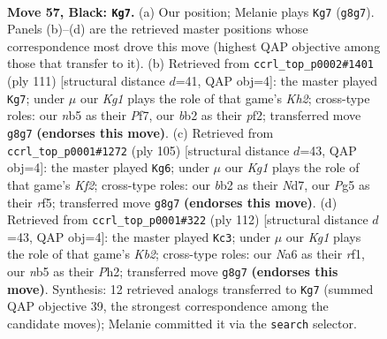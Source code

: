 \documentclass[11pt]{article}
\begin{document}
\clearpage

\begin{figure}[p]\centering
\begin{subfigure}{0.46\textwidth}\centering
\resizebox{\linewidth}{!}{%
\newchessgame
\chessboard[
  setfen={6k1/4p3/npr4p/pN4p1/P1p5/2P2PK1/1B1R4/8 b - - 3 57},
  showmover=false,
  pgfstyle=straightmove, color=movearrow, markmove={g8-g7}
]}
\caption{}
\end{subfigure}\hfill
\begin{subfigure}{0.46\textwidth}\centering
\resizebox{\linewidth}{!}{%
\newchessgame
\chessboard[
  setfen={8/5p1k/1p2r2p/6p1/P2Rp1P1/4P3/5PPK/8 b - - 16 56},
  showmover=false,
  pgfstyle=straightmove, color=movearrow, markmove={h7-g7}
]}
\caption{}
\end{subfigure}
\\[4pt]
\begin{subfigure}{0.46\textwidth}\centering
\resizebox{\linewidth}{!}{%
\newchessgame
\chessboard[
  setfen={8/1p1n1k2/p1pr3p/5R2/2P5/2B2P1P/1P3K2/8 b - - 6 53},
  showmover=false,
  pgfstyle=straightmove, color=movearrow, markmove={f7-g6}
]}
\caption{}
\end{subfigure}\hfill
\begin{subfigure}{0.46\textwidth}\centering
\resizebox{\linewidth}{!}{%
\newchessgame
\chessboard[
  setfen={8/p2k1p2/1p2p1p1/1P2P3/P3R2P/8/1KP4P/5r2 w - - 11 57},
  showmover=false,
  pgfstyle=straightmove, color=movearrow, markmove={b2-c3}
]}
\caption{}
\end{subfigure}
\caption{\textbf{Move 57, Black: \texttt{Kg7}.} (a) Our position; Melanie plays \texttt{Kg7} (\texttt{g8g7}). Panels (b)--(d) are the retrieved master positions whose correspondence most drove this move (highest QAP objective among those that transfer to it). (b) Retrieved from \texttt{ccrl\_top\_p0002\#1401} (ply 111) [structural distance $d$=41, QAP obj=4]: the master played \texttt{Kg7}; under $\mu$ our \emph{Kg1} plays the role of that game's \emph{Kh2}; cross-type roles: our \emph{n}b5 as their \emph{P}f7, our \emph{b}b2 as their \emph{p}f2; transferred move \texttt{g8g7} \textbf{(endorses this move)}. (c) Retrieved from \texttt{ccrl\_top\_p0001\#1272} (ply 105) [structural distance $d$=43, QAP obj=4]: the master played \texttt{Kg6}; under $\mu$ our \emph{Kg1} plays the role of that game's \emph{Kf2}; cross-type roles: our \emph{b}b2 as their \emph{N}d7, our \emph{P}g5 as their \emph{r}f5; transferred move \texttt{g8g7} \textbf{(endorses this move)}. (d) Retrieved from \texttt{ccrl\_top\_p0001\#322} (ply 112) [structural distance $d$=43, QAP obj=4]: the master played \texttt{Kc3}; under $\mu$ our \emph{Kg1} plays the role of that game's \emph{Kb2}; cross-type roles: our \emph{N}a6 as their \emph{r}f1, our \emph{n}b5 as their \emph{P}h2; transferred move \texttt{g8g7} \textbf{(endorses this move)}. Synthesis: 12 retrieved analogs transferred to \texttt{Kg7} (summed QAP objective 39, the strongest correspondence among the candidate moves); Melanie committed it via the \texttt{search} selector.}
\label{fig:thought-m113}
\end{figure}
\end{document}
